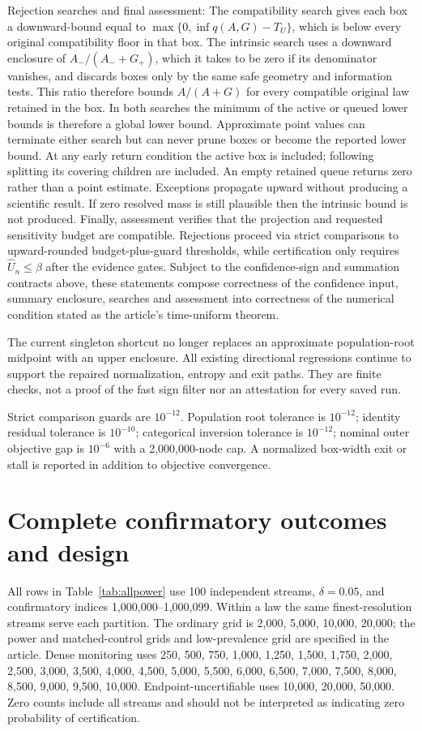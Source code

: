 Rejection searches and final assessment: The compatibility search gives each box a downward-bound equal to $\max\{0,\inf q(A,G)-T_U\}$, which is below every original compatibility floor in that box. The intrinsic search uses a downward enclosure of $A_-/(A_-+G_+)$, which it takes to be zero if its denominator vanishes, and discards boxes only by the same safe geometry and information tests. This ratio therefore bounds $A/(A+G)$ for every compatible original law retained in the box. In both searches the minimum of the active or queued lower bounds is therefore a global lower bound. Approximate point values can terminate either search but can never prune boxes or become the reported lower bound. At any early return condition the active box is included; following splitting its covering children are included. An empty retained queue returns zero rather than a point estimate. Exceptions propagate upward without producing a scientific result. If zero resolved mass is still plausible then the intrinsic bound is not produced. Finally, assessment verifies that the projection and requested sensitivity budget are compatible. Rejections proceed via strict comparisons to upward-rounded budget-plus-guard thresholds, while certification only requires $\widehat U_n\le\beta$ after the evidence gates. Subject to the confidence-sign and summation contracts above, these statements compose correctness of the confidence input, summary enclosure, searches and assessment into correctness of the numerical condition stated as the article's time-uniform theorem.

The current singleton shortcut no longer replaces an approximate population-root midpoint with an upper enclosure. All existing directional regressions continue to support the repaired normalization, entropy and exit paths. They are finite checks, not a proof of the fast sign filter nor an attestation for every saved run.

Strict comparison guards are $10^{-12}$. Population root tolerance is $10^{-12}$; identity residual tolerance is $10^{-10}$; categorical inversion tolerance is $10^{-12}$; nominal outer objective gap is $10^{-6}$ with a 2,000,000-node cap. A normalized box-width exit or stall is reported in addition to objective convergence.

\section{Complete confirmatory outcomes and design}

All rows in Table~\ref{tab:allpower} use 100 independent streams, $\delta=0.05$, and confirmatory indices 1,000,000--1,000,099. Within a law the same finest-resolution streams serve each partition. The ordinary grid is 2,000, 5,000, 10,000, 20,000; the power and matched-control grids and low-prevalence grid are specified in the article. Dense monitoring uses 250, 500, 750, 1,000, 1,250, 1,500, 1,750, 2,000, 2,500, 3,000, 3,500, 4,000, 4,500, 5,000, 5,500, 6,000, 6,500, 7,000, 7,500, 8,000, 8,500, 9,000, 9,500, 10,000. Endpoint-uncertifiable uses 10,000, 20,000, 50,000. Zero counts include all streams and should not be interpreted as indicating zero probability of certification.

